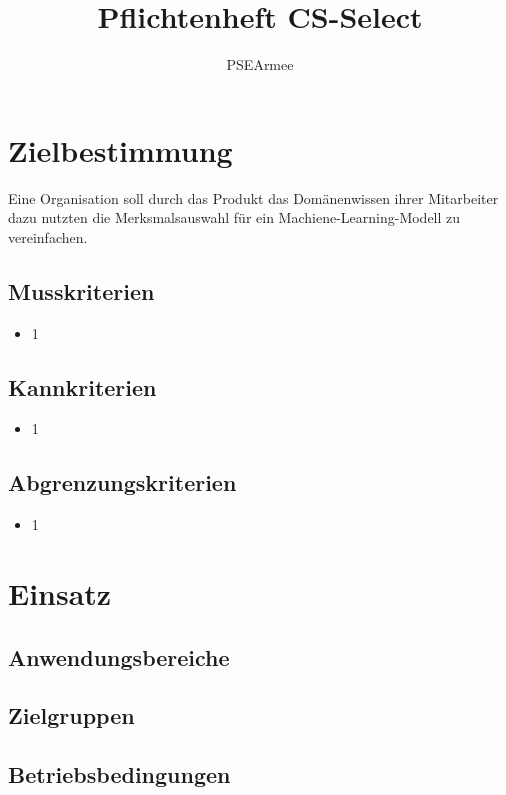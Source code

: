 \documentclass[a4paper]{scrreprt}
\begin{document}
 
\title{Pflichtenheft CS-Select}
\author{PSEArmee}
\maketitle
 
\tableofcontents
 
\chapter{Zielbestimmung}
Eine Organisation soll durch das \Gls{Produkt} das Domänenwissen ihrer Mitarbeiter dazu nutzten die Merksmalsauswahl für ein Machiene-Learning-Modell zu vereinfachen. 
\section{Musskriterien}
\begin{itemize}
\item 1
\end{itemize} 
\section{Kannkriterien}
\begin{itemize}
\item 1
\end{itemize} 
 
\section{Abgrenzungskriterien}
\begin{itemize} 
\item 1
\end{itemize} 
 
\chapter{Einsatz}
 
\section{Anwendungsbereiche}
 
\section{Zielgruppen}
 
\section{Betriebsbedingungen}
 
\end{document}
